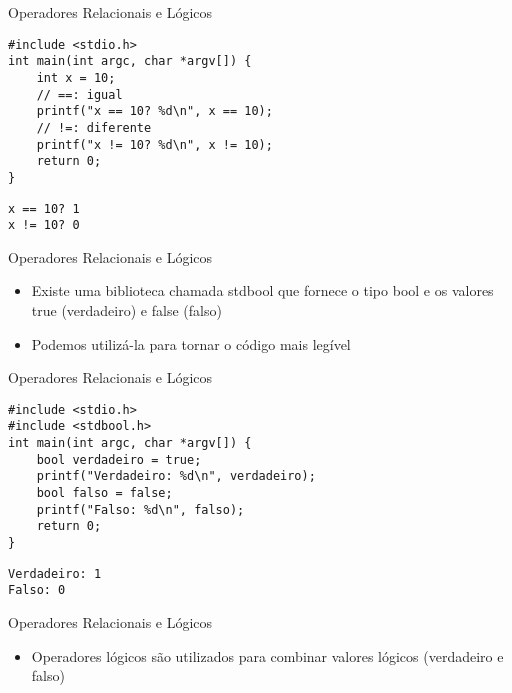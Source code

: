 \documentclass[t, aspectratio=169]{beamer}
\begin{document}
\begin{frame}[label={sec:orge84941f},fragile]{Operadores Relacionais e Lógicos}
 \vspace{-0.5cm}
\begin{verbatim}
#include <stdio.h>
int main(int argc, char *argv[]) {
    int x = 10;
    // ==: igual
    printf("x == 10? %d\n", x == 10);
    // !=: diferente
    printf("x != 10? %d\n", x != 10);
    return 0;
}
\end{verbatim}

\begin{verbatim}
x == 10? 1
x != 10? 0
\end{verbatim}
\end{frame}

\begin{frame}[label={sec:org27c3ee8}]{Operadores Relacionais e Lógicos}
\begin{itemize}
\item Existe uma biblioteca chamada \alert{stdbool} que fornece o tipo \alert{bool}
e os valores \alert{true} (verdadeiro) e \alert{false} (falso)
\item Podemos utilizá-la para tornar o código mais legível
\end{itemize}
\end{frame}

\begin{frame}[label={sec:org7f4af16},fragile]{Operadores Relacionais e Lógicos}
 \vspace{-0.5cm}
\begin{verbatim}
#include <stdio.h>
#include <stdbool.h>
int main(int argc, char *argv[]) {
    bool verdadeiro = true;
    printf("Verdadeiro: %d\n", verdadeiro);
    bool falso = false;
    printf("Falso: %d\n", falso);
    return 0;
}
\end{verbatim}

\begin{verbatim}
Verdadeiro: 1
Falso: 0
\end{verbatim}
\end{frame}

\begin{frame}[label={sec:orgfcac18d}]{Operadores Relacionais e Lógicos}
\begin{itemize}
\item Operadores lógicos são utilizados para combinar valores
lógicos (verdadeiro e falso)
\end{itemize}
\end{frame}
\end{document}
